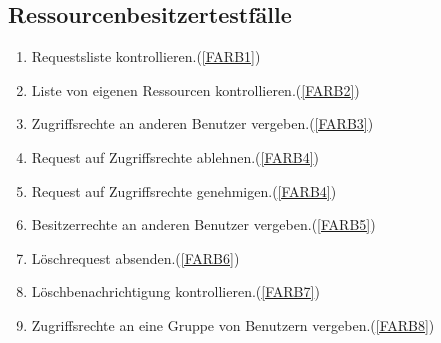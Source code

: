 \documentclass[parskip=full,11pt]{scrartcl}
\def\threedigits#1{%
  \ifnum#1<10 0\fi
  \ifnum#1<1 0\fi
  \number#1}
\begin{document}
\subsection{Ressourcenbesitzertestfälle}
\begin{enumerate}[label={\textbf{/T\protect\threedigits{\theenumi}0/}}, leftmargin=*, resume]
\item Requestsliste kontrollieren.(\ref{FARB1})
\item Liste von eigenen Ressourcen kontrollieren.(\ref{FARB2})  %
\item Zugriffsrechte an anderen Benutzer vergeben.(\ref{FARB3})
\item Request auf Zugriffsrechte ablehnen.(\ref{FARB4})
\item Request auf Zugriffsrechte genehmigen.(\ref{FARB4})
\item Besitzerrechte an anderen Benutzer vergeben.(\ref{FARB5})
\item Löschrequest absenden.(\ref{FARB6})
\item Löschbenachrichtigung kontrollieren.(\ref{FARB7})
\item Zugriffsrechte an eine Gruppe von Benutzern vergeben.(\ref{FARB8}) 
\end{enumerate}
\newpage
{}
\printglossary	
\glsaddall
\end{document}
